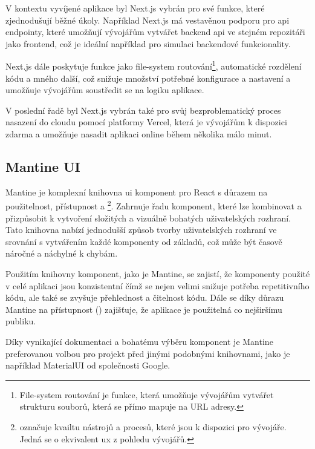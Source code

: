 V kontextu vyvíjené aplikace byl Next.js vybrán pro své funkce, které zjednodušují běžné úkoly.
Například Next.js má vestavěnou podporu pro \acs{api} endpointy, které umožňují vývojářům vytvářet backend \acs{api} ve stejném repozitáři jako frontend, což je ideální například pro simulaci backendové funkcionality\cite{n_nextjs_org_docs}.

Next.js dále poskytuje funkce jako file-system routování\footnote{File-system routování je funkce, která umožňuje vývojářům vytvářet strukturu souborů, která se přímo mapuje na URL adresy.}, automatické rozdělení kódu a mného další, což snižuje množství potřebné konfigurace a nastavení a umožňuje vývojářům soustředit se na logiku aplikace\cite{n_nextjs_org_docs}.

V poslední řadě byl Next.js vybrán také pro svůj bezproblematický proces nasazení do cloudu pomocí platformy Vercel, která je vývojářům k dispozici zdarma a umožňuje nasadit aplikaci online během několika málo minut\cite{n_nextjs_org_docs}.

\subsection{Mantine UI}
\label{subsec:implementace-technologie-mantine}
Mantine je komplexní knihovna \ac{ui} komponent pro React s důrazem na použitelnost, přístupnost a \footnote{ označuje kvailtu nástrojů a procesů, které jsou k dispozici pro vývojáře.
Jedná se o ekvivalent \acl{ux} z pohledu vývojářů.}.
Zahrnuje řadu komponent, které lze kombinovat a přizpůsobit k vytvoření složitých a vizuálně bohatých uživatelských rozhraní.
Tato knihovna nabízí jednodušší způsob tvorby uživatelských rozhraní ve srovnání s vytvářením každé komponenty od základů, což může být časově náročné a náchylné k chybám.

Použitím knihovny komponent, jako je Mantine, se zajistí, že komponenty použité v celé aplikaci jsou konzistentní čímž se nejen velimi snižuje potřeba repetitivního kódu, ale také se zvyšuje přehlednost a čitelnost kódu.
Dále se díky důrazu Mantine na přístupnost () zajišťuje, že aplikace je použitelná co nejširšímu publiku\cite{m__mantine_dev}.

Díky vynikající dokumentaci a bohatému výběru komponent je Mantine preferovanou volbou pro projekt před jinými podobnými knihovnami, jako je například MaterialUI od společnosti Google\cite{m__mui_com}.

